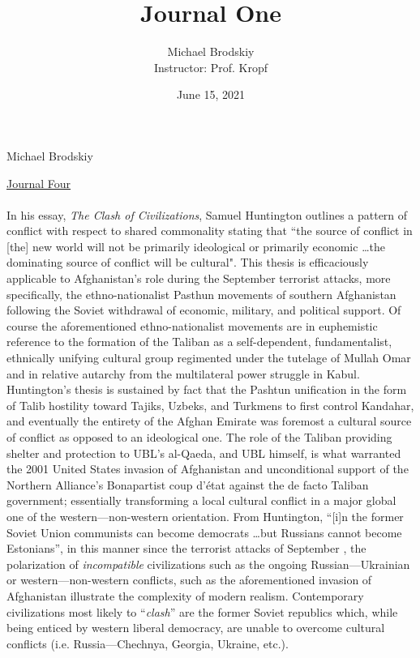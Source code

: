 \documentclass[12pt]{article}
\title{Journal One}
\date{June 15, 2021}
\author{Michael Brodskiy\\ \small Instructor: Prof. Kropf}
\begin{document}
\flushleft Michael Brodskiy

\begin{center}

\underline{Journal Four}

\end{center}

\begin{justify}

  \paragraph{} In his essay, \emph{The Clash of Civilizations}, Samuel Huntington outlines a pattern of conflict with respect to shared commonality stating that “the source of conflict in [the] new world will not be primarily ideological or primarily economic \dots the dominating source of conflict will be cultural". This thesis is efficaciously applicable to Afghanistan's role during the September  terrorist attacks, more specifically, the ethno-nationalist Pasthun movements of southern Afghanistan following the Soviet withdrawal of economic, military, and political support. Of course the aforementioned ethno-nationalist movements are in euphemistic reference to the formation of the Taliban as a self-dependent, fundamentalist, ethnically unifying cultural group regimented under the tutelage of Mullah Omar and in relative autarchy from the multilateral power struggle in Kabul. Huntington's thesis is sustained by fact that the Pashtun unification in the form of Talib hostility toward Tajiks, Uzbeks, and Turkmens to first control Kandahar, and eventually the entirety of the Afghan Emirate was foremost a cultural source of conflict as opposed to an ideological one. The role of the Taliban providing shelter and protection to UBL's al-Qaeda, and UBL himself, is what warranted the 2001 United States invasion of Afghanistan and unconditional support of the Northern Alliance's Bonapartist coup d'\'etat against the de facto Taliban government; essentially transforming a local cultural conflict in a major global one of the western—non-western orientation. From Huntington, “[i]n the former Soviet Union communists can become democrats \dots but Russians cannot become Estonians”, in this manner since the terrorist attacks of September , the polarization of \emph{incompatible} civilizations such as the ongoing Russian—Ukrainian or western—non-western conflicts, such as the aforementioned invasion of Afghanistan illustrate the complexity of modern realism. Contemporary civilizations most likely to “\emph{clash}” are the former Soviet republics which, while being enticed by western liberal democracy, are unable to overcome cultural conflicts (i.e. Russia—Chechnya, Georgia, Ukraine, etc.).

\end{justify}
\end{document}
